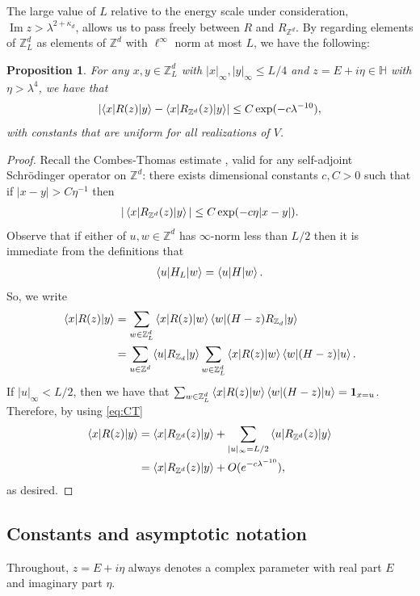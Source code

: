 \documentclass[11pt]{amsart}
\def\bbH{{\mathbb H}}
\def\Z{{\mathbb{Z}}}
\def\One{{\mathbf{1}}}
\newcommand{\Impt}{\operatorname*{Im}}
\def\braket#1{\mathinner{\langle{#1}\rangle}}
\numberwithin{equation}{section}
\numberwithin{theorem}{section}
\newtheorem{proposition}[theorem]{Proposition}
\begin{document}
The large value of $L$ relative to the energy scale under consideration, $\Impt z>\lambda^{2+\kappa_d}$, allows us to pass freely between $R$ and $R_{\Z^d}$. By regarding elements of $\Z^d_L$ as elements of $\Z^d$ with $\ell^\infty$ norm at most $L$, we have the following:
\begin{proposition}
\label{prp:Zd-to-ZdL}
For any $x,y\in \Z^d_L$ with $|x|_\infty,|y|_\infty\leq L/4$ and $z=E+i\eta\in \bbH$ with $\eta>\lambda^{4}$, we have that
\begin{align*}
    \left|\braket{x|R(z)|y}-\braket{x|R_{\Z^d}(z)|y}\right|\leq C \exp(-c\lambda^{-10}),
\end{align*}
with constants that are uniform for all realizations of $V$.
\end{proposition}
\begin{proof}
Recall the Combes-Thomas estimate \cite[Thm 10.5]{aizenman2015random}, valid for any self-adjoint Schr\"{o}dinger operator on $\Z^d$: there exists dimensional constants $c,C>0$ such that if $|x-y|>C\eta^{-1}$ then
\begin{align}
\label{eq:CT}
|\braket{x|R_{\Z^d}(z)|y}|\leq C\exp(-c\eta|x-y|).
\end{align}
Observe that if either of $u,w\in \Z^d$ has $\infty$-norm less than $L/2$ then it is immediate from the definitions that
\begin{align*}
\braket{u|H_L|w}=\braket{u|H|w}.
\end{align*}
So, we write
\begin{align*}
\braket{x|R(z)|y}&=\sum_{w\in \Z^d_L}\braket{x|R(z)|w}\braket{w|(H-z)R_{\Z_d}|y}\\
&=\sum_{u\in \Z^d}\braket{u|R_{\Z_d}|y}\sum_{w\in \Z^d_L}\braket{x|R(z)|w}\braket{w|(H-z)|u}.
\end{align*}
If $|u|_\infty<L/2$, then we have that $\sum_{w\in \Z^d_L}\braket{x|R(z)|w}\braket{w|(H-z)|u}=\One_{x=u}$. Therefore, by using \eqref{eq:CT}
\begin{align*}
\braket{x|R(z)|y}&=\braket{x|R_{\Z^d}(z)|y}+\sum_{|u|_\infty=L/2}\braket{u|R_{\Z^d}(z)|y}\\
&=\braket{x|R_{\Z^d}(z)|y}+O(e^{-c\lambda^{-10}}),
\end{align*}
as desired.
\end{proof}

\subsection{Constants and asymptotic notation}
Throughout, $z=E+i\eta$ always denotes a complex parameter with real part $E$ and imaginary part $\eta$.
\end{document}
